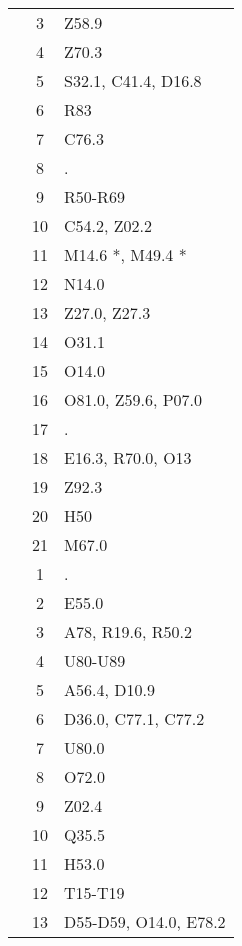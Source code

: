 \begin{table}[htbp]
\begin{tabular}{c c l}
	 & 3 & Z58.9 \\
	 & 4 & Z70.3 \\
	 & 5 & S32.1, C41.4, D16.8 \\
	 & 6 & R83 \\
	 & 7 & C76.3 \\
	 & 8 & . \\
	 & 9 & R50-R69 \\
	 & 10 & C54.2, Z02.2 \\
	 & 11 & M14.6 *, M49.4 * \\
	 & 12 & N14.0 \\
	 & 13 & Z27.0, Z27.3 \\
	 & 14 & O31.1 \\
	 & 15 & O14.0 \\
	 & 16 & O81.0, Z59.6, P07.0 \\
	 & 17 & . \\
	 & 18 & E16.3, R70.0, O13 \\
	 & 19 & Z92.3 \\
	 & 20 & H50 \\
	 & 21 & M67.0 \\
	\addlinespace
	8 & 1 & . \\
	 & 2 & E55.0 \\
	 & 3 & A78, R19.6, R50.2 \\
	 & 4 & U80-U89 \\
	 & 5 & A56.4, D10.9 \\
	 & 6 & D36.0, C77.1, C77.2 \\
	 & 7 & U80.0 \\
	 & 8 & O72.0 \\
	 & 9 & Z02.4 \\
	 & 10 & Q35.5 \\
	 & 11 & H53.0 \\
	 & 12 & T15-T19 \\
	 & 13 & D55-D59, O14.0, E78.2 \\
	\bottomrule
\end{tabular}
\end{table}


